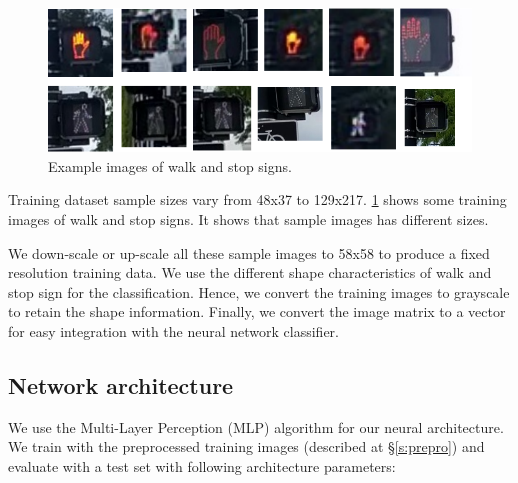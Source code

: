 \begin{figure}
\centering
\includegraphics[width=5.2in]{figures/walk_stop.pdf}
\caption{Example images of walk and stop signs.}
\label{f:walk_stop}
\end{figure}


Training dataset sample sizes vary from 48x37 to 129x217.
\ref{f:walk_stop} shows some training images of walk and stop signs.
It shows that sample images has different sizes.

We down-scale or up-scale all these sample images to 58x58 to produce a fixed resolution training data.
We use the different shape characteristics of walk and stop sign for the classification.
Hence, we convert the training images to grayscale to retain the shape information. 
Finally, we convert the image matrix to a vector for easy integration with the neural network classifier.

\subsection{Network architecture}
\label{s:neural}
We use the Multi-Layer Perception (MLP) algorithm for our neural architecture.
We train with the preprocessed training images (described at \S\ref{s:prepro}) and evaluate with a test set with following architecture parameters:

